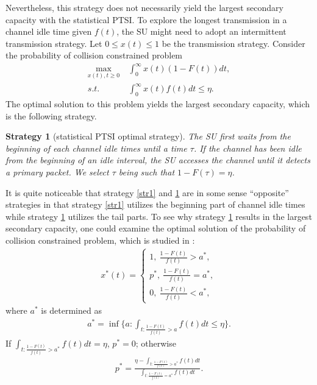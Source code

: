 \documentclass[10pt,final,journal,letterpaper]{IEEEtran}
\newtheorem{strategy}{Strategy}
\begin{document}
\par
Nevertheless, this strategy does not necessarily yield the largest secondary capacity with the statistical PTSI. To explore the longest transmission in a channel idle time given $f(t)$, the SU might need to adopt an intermittent transmission strategy. Let $0\leq x(t)\leq 1$ be the transmission strategy. Consider the probability of collision constrained problem
\begin{align}
    \max\limits_{x(t),t\geq 0}&\ \int_0^{\infty}x(t)(1-F(t))dt,\nonumber\\
    s.t.&\ \int_0^{\infty}x(t)f(t)dt\leq\eta.\nonumber
\end{align}
The optimal solution to this problem yields the largest secondary capacity, which is the following strategy.
\begin{strategy}[statistical PTSI optimal strategy]\label{str2}
The SU first waits from the beginning of each channel idle times until a time $\tau$. If the channel has been idle from the beginning of an idle interval, the SU accesses the channel until it detects a primary packet. We select $\tau$ being such that $1-F(\tau)=\eta$.
\end{strategy}
It is quite noticeable that strategy \ref{str1} and \ref{str2} are in some sense ``opposite'' strategies in that strategy \ref{str1} utilizes the beginning part of channel idle times while strategy \ref{str2} utilizes the tail parts. To see why strategy \ref{str2} results in the largest secondary capacity, one could examine the optimal solution of the probability of collision constrained problem, which is studied in \cite{huang2009optimal}:
\begin{align}\label{sec3statopt}
    x^{\ast}(t)=
    \begin{cases}
    1,\ \frac{1-F(t)}{f(t)}>a^{\ast},\\
    p^{\ast},\ \frac{1-F(t)}{f(t)}=a^{\ast},\\
    0,\ \frac{1-F(t)}{f(t)}<a^{\ast},
    \end{cases}
\end{align}
where $a^{\ast}$ is determined as
\begin{align}
    a^{\ast}=\inf\Big\{a:\int_{t:\frac{1-F(t)}{f(t)}>a}f(t)dt\leq\eta\Big\}.\nonumber
\end{align}
If $\int_{t:\frac{1-F(t)}{f(t)}>a^{\ast}}f(t)dt=\eta$, $p^{\ast}=0$; otherwise
\begin{align}
    p^{\ast}=\frac{\eta-\int_{t:\frac{1-F(t)}{f(t)}>a^{\ast}}f(t)dt}{\int_{t:\frac{1-F(t)}{f(t)}=a^{\ast}}f(t)dt}.\nonumber
\end{align}
\end{document}
